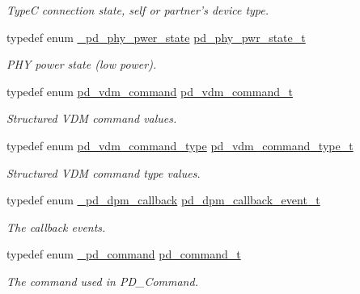 \begin{DoxyCompactItemize}
\begin{DoxyCompactList}\small\item\em Type\-C connection state, self or partner's device type. \end{DoxyCompactList}\item 
typedef enum \hyperlink{group__usb__pd__stack_ga71b74b2e350f1841b93c1f894403f85b}{\-\_\-pd\-\_\-phy\-\_\-pwer\-\_\-state} \hyperlink{group__usb__pd__stack_gaba31b8436256d541d1f6f9cd01c94fe5}{pd\-\_\-phy\-\_\-pwr\-\_\-state\-\_\-t}
\begin{DoxyCompactList}\small\item\em P\-H\-Y power state (low power). \end{DoxyCompactList}\item 
typedef enum \hyperlink{group__usb__pd__stack_gac4a67ecdc78b1a071ca6505a765a301f}{pd\-\_\-vdm\-\_\-command} \hyperlink{group__usb__pd__stack_gabd6b0763d01e2d65501af70e4f67b039}{pd\-\_\-vdm\-\_\-command\-\_\-t}
\begin{DoxyCompactList}\small\item\em Structured V\-D\-M command values. \end{DoxyCompactList}\item 
typedef enum \hyperlink{group__usb__pd__stack_gaa6b2f8f6620280d0d17ab102c5992ca8}{pd\-\_\-vdm\-\_\-command\-\_\-type} \hyperlink{group__usb__pd__stack_ga3da8531f25ed451f0392fc7efdf7fabe}{pd\-\_\-vdm\-\_\-command\-\_\-type\-\_\-t}
\begin{DoxyCompactList}\small\item\em Structured V\-D\-M command type values. \end{DoxyCompactList}\item 
typedef enum \hyperlink{group__usb__pd__stack_ga6e10571af6af1a42760ea442ab580eb8}{\-\_\-pd\-\_\-dpm\-\_\-callback} \hyperlink{group__usb__pd__stack_ga75d3b9ae5fd2d84e59b0754f9855cb61}{pd\-\_\-dpm\-\_\-callback\-\_\-event\-\_\-t}
\begin{DoxyCompactList}\small\item\em The callback events. \end{DoxyCompactList}\item 
typedef enum \hyperlink{group__usb__pd__stack_gabf2676c3360b7c572954ae09c0a5e46a}{\-\_\-pd\-\_\-command} \hyperlink{group__usb__pd__stack_ga91457cf9522e345a0efa2e2a7424bb0d}{pd\-\_\-command\-\_\-t}
\begin{DoxyCompactList}\small\item\em The command used in P\-D\-\_\-\-Command. \end{DoxyCompactList}\item 

\end{DoxyCompactItemize}
